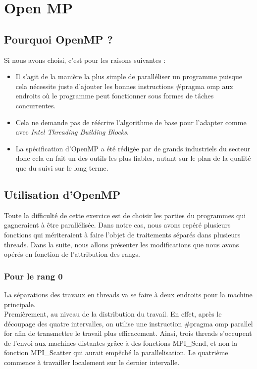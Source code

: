 \chapter{Open MP}
	\section{Pourquoi OpenMP ?}
		Si nous avons choisi, c'est pour les raisons suivantes : \\
		\begin{itemize}
			\item Il s'agit de la manière la plus simple de paralléliser un programme puisque cela nécessite juste d'ajouter les bonnes instructions \og \#pragma omp \fg aux endroits où le programme peut fonctionner sous formes de tâches concurrentes.
			\item Cela ne demande pas de réécrire l'algorithme de base pour l'adapter comme avec \emph{Intel Threading Building Blocks}.
			\item La spécification d'OpenMP a été rédigée par de grands industriels du secteur donc cela en fait un des outils les plus fiables, autant sur le plan de la qualité que du suivi sur le long terme.\\
		\end{itemize}
	
	\section{Utilisation d'OpenMP}
			Toute la difficulté de cette exercice est de choisir les parties du programmes qui gagneraient à être parallélisée. Dans notre cas, nous avons repéré plusieurs fonctions qui mériteraient à faire l'objet de traitements séparés dans plusieurs threads. Dans la suite, nous allons présenter les modifications que nous avons opérés en fonction de l'attribution des rangs. 
		\subsection{Pour le rang 0}
			La séparations des travaux en threads va se faire à deux endroits pour la machine principale. \\
			
			Premièrement, au niveau de la distribution du travail. En effet, après le découpage des quatre intervalles, on utilise une instruction \og \#pragma omp parallel for \fg afin de transmettre le travail plus efficacement. Ainsi, trois threads s'occupent de l'envoi aux machines distantes grâce à des fonctions MPI\_Send, et non la fonction MPI\_Scatter qui aurait empêché la parallelisation. Le quatrième commence à travailler localement sur le dernier intervalle.\\
			
